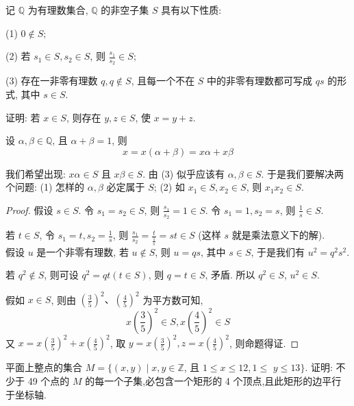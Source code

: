 \begin{example}
	记 $\mathbb{Q}$ 为有理数集合, $\mathbb{Q}$ 的非空子集 $S$ 具有以下性质:

	(1) $0 \notin S$;

	(2) 若 $s_{1} \in S, s_{2} \in S$, 则 $\frac{s_{1}}{s_{2}} \in S$;

	(3) 存在一非零有理数 $q, q \notin S$, 且每一个不在 $S$ 中的非零有理数都可写成 $q s$ 的形式, 其中 $s \in S$.

	证明: 若 $x \in S$, 则存在 $y, z \in S$, 使 $x=y+z$.
\end{example}
\begin{analysis}
	设 $\alpha, \beta \in \mathbb{Q}$, 且 $\alpha+\beta=1$, 则
	$$
		x=x(\alpha+\beta)=x \alpha+x \beta
	$$

	我们希望出现: $x \alpha \in S$ 且 $x \beta \in S$. 由 (3) 似乎应该有 $\alpha, \beta \in S$. 于是我们要解决两个问题: (1) 怎样的 $\alpha, \beta$ 必定属于 $S$; (2) 如 $x_{1} \in S, x_{2} \in S$, 则 $x_{1} x_{2} \in S$.
\end{analysis}
\begin{proof}
	假设 $s \in S$. 令 $s_{1}=s_{2} \in S$, 则 $\frac{s_{1}}{s_{2}}=1 \in S$. 令 $s_{1}=1, s_{2}=s$, 则 $\frac{1}{s} \in S$.

	若 $t \in S$, 令 $s_{1}=t, s_{2}=\frac{1}{s}$, 则 $\frac{s_{1}}{s_{2}}=\frac{t}{\frac{1}{s}}=s t \in S$ (这样 $s$ 就是乘法意义下的解).\\
	假设 $u$ 是一个非零有理数, 若 $u \notin S$, 则 $u=q s$, 其中 $s \in S$, 于是我们有 $u^{2}=q^{2} s^{2}$.

	若 $q^{2} \notin S$, 则可设 $q^{2}=q t(t \in S)$, 则 $q=t \in S$, 矛盾. 所以 $q^{2} \in S$, $u^{2} \in S$.

	假如 $x \in S$, 则由 $\left(\frac{3}{5}\right)^{2} 、\left(\frac{4}{5}\right)^{2}$ 为平方数可知,
	$$
		x\left(\frac{3}{5}\right)^{2} \in S, x\left(\frac{4}{5}\right)^{2} \in S
	$$
	又 $x=x\left(\frac{3}{5}\right)^{2}+x\left(\frac{4}{5}\right)^{2}$, 取 $y=x\left(\frac{3}{5}\right)^{2}, z=x\left(\frac{4}{5}\right)^{2}$, 则命题得证.
\end{proof}

\begin{example}
	平面上整点的集合 $M=\{(x, y) \mid x, y \in \mathbb{Z}$, 且 $1 \leqslant x \leqslant 12,1 \leqslant$ $y \leqslant 13\}$. 证明: 不少于 49 个点的 $M$ 的每一个子集,必包含一个矩形的 4 个顶点,且此矩形的边平行于坐标轴.
\end{example}

